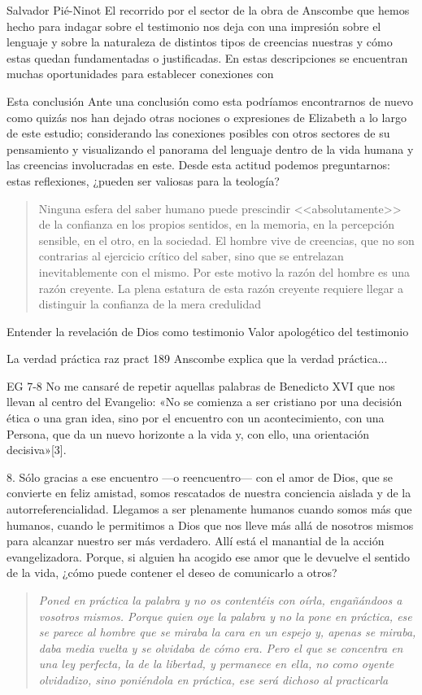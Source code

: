 Salvador Pié-Ninot
El recorrido por el sector de la obra de Anscombe que hemos hecho para indagar sobre el testimonio nos deja con una impresión sobre el lenguaje y sobre la naturaleza de distintos tipos de creencias nuestras y cómo estas quedan fundamentadas o justificadas. En estas descripciones se encuentran muchas oportunidades para establecer conexiones con


Esta conclusión
Ante una conclusión como esta podríamos encontrarnos de nuevo como quizás nos han dejado otras nociones o expresiones de Elizabeth a lo largo de este estudio; considerando las conexiones posibles con otros sectores de su pensamiento y visualizando el panorama del lenguaje dentro de la vida humana y las creencias involucradas en este. Desde esta actitud podemos preguntarnos: estas reflexiones, ¿pueden ser valiosas para la teología?

\blockquote[{\Cite[451]{prades2015testimonio}}]{Ninguna esfera del saber humano puede prescindir <<absolutamente>> de la confianza en los propios sentidos, en la memoria, en la percepción sensible, en el otro, en la sociedad. El hombre vive de creencias, que no son contrarias al ejercicio crítico del saber, sino que se entrelazan inevitablemente con el mismo. Por este motivo la razón del hombre es una razón creyente. La plena estatura de esta razón creyente requiere llegar a distinguir la confianza de la mera credulidad}.



Entender la revelación de Dios como testimonio
Valor apologético del testimonio


La verdad práctica raz pract 189
Anscombe explica que la verdad práctica...


EG 7-8
No me cansaré de repetir aquellas palabras de Benedicto XVI que nos llevan al centro del Evangelio: «No se comienza a ser cristiano por una decisión ética o una gran idea, sino por el encuentro con un acontecimiento, con una Persona, que da un nuevo horizonte a la vida y, con ello, una orientación decisiva»[3].

8. Sólo gracias a ese encuentro —o reencuentro— con el amor de Dios, que se convierte en feliz amistad, somos rescatados de nuestra conciencia aislada y de la autorreferencialidad. Llegamos a ser plenamente humanos cuando somos más que humanos, cuando le permitimos a Dios que nos lleve más allá de nosotros mismos para alcanzar nuestro ser más verdadero. Allí está el manantial de la acción evangelizadora. Porque, si alguien ha acogido ese amor que le devuelve el sentido de la vida, ¿cómo puede contener el deseo de comunicarlo a otros?


\blockquote[][\,(St 1, 22-25)]{\emph{Poned en práctica la palabra y no os contentéis con oírla, engañándoos a vosotros mismos. Porque quien oye la palabra y no la pone en práctica, ese se parece al hombre que se miraba la cara en un espejo y, apenas se miraba, daba media vuelta y se olvidaba de cómo era. Pero el que se concentra en una ley perfecta, la de la libertad, y permanece en ella, no como oyente olvidadizo, sino poniéndola en práctica, ese será dichoso al practicarla}}.
